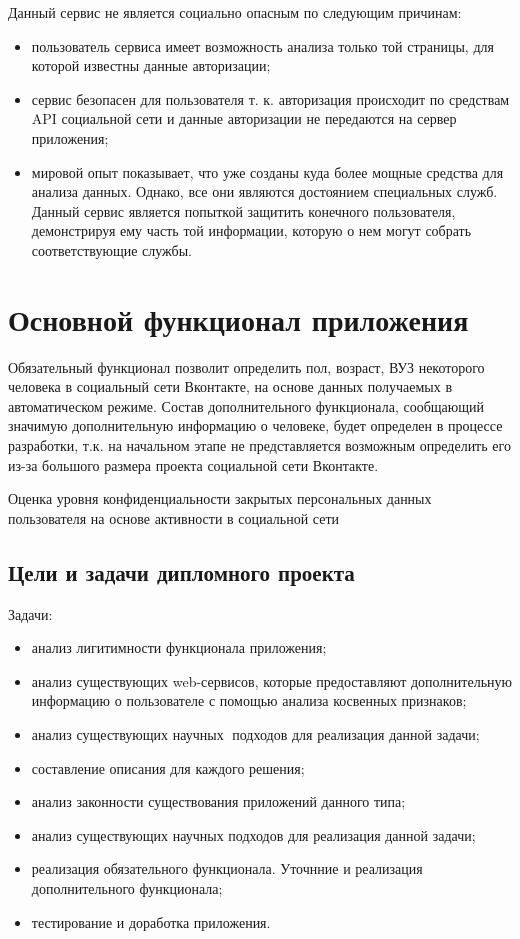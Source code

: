 \begin{chap1}
Данный сервис не является социально опасным по следующим причинам:
\begin{itemize}
\item пользователь сервиса имеет возможность анализа только той страницы, для которой известны данные авторизации;
\item сервис безопасен для пользователя т. к. авторизация происходит по средствам  API  социальной сети и данные авторизации не передаются на сервер приложения; 
\item мировой опыт показывает, что уже созданы куда более мощные средства для анализа данных. Однако, все они являются достоянием специальных служб. Данный сервис является попыткой защитить конечного пользователя, демонстрируя ему часть той информации, которую о нем могут собрать соответствующие службы.
\end{itemize}

\section{Основной функционал приложения}
Обязательный функционал позволит определить пол, возраст, ВУЗ некоторого человека в социальный сети Вконтакте, на основе данных получаемых в автоматическом режиме. Состав дополнительного функционала, сообщающий значимую дополнительную информацию о человеке,  будет определен в процессе разработки, т.к. на начальном этапе не представляется возможным определить его из-за большого размера проекта социальной сети Вконтакте.

Оценка уровня конфиденциальности закрытых персональных данных пользователя на основе активности в социальной сети

\subsection{Цели и задачи дипломного проекта}
Задачи:
	\begin{itemize}
\item анализ лигитимности функционала приложения;
\item анализ существующих web-сервисов, которые предоставляют дополнительную информацию о пользователе с помощью анализа косвенных признаков;
\item анализ существующих научных подходов для реализация данной задачи;
\item составление описания для каждого решения;
\item анализ законности существования приложений данного типа;
\item анализ существующих научных подходов для реализация данной задачи;
\item реализация обязательного функционала. Уточнние и реализация дополнительного функционала;
\item тестирование и доработка приложения.
	\end{itemize}
	

\end{chap1}
